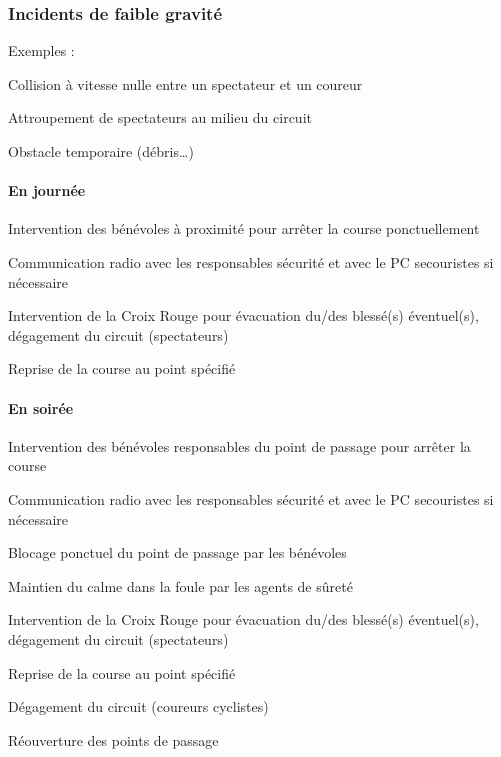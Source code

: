 \documentclass[hidelinks, paper=a4, fontsize=13pt]{report}
\begin{document}
\subsubsection{Incidents de faible gravité}


Exemples :
\begin{list}{•}{}
\item Collision à vitesse nulle entre un spectateur et un coureur
\item Attroupement de spectateurs au milieu du circuit
\item Obstacle temporaire (débris…)
\end{list}


\paragraph{En journée}

\begin{list}{•}{}
\item Intervention des bénévoles à proximité pour arrêter la course ponctuellement 
\item Communication radio avec les responsables sécurité et avec le PC secouristes si nécessaire
\item Intervention de la Croix Rouge pour évacuation du/des blessé(s) éventuel(s), dégagement du circuit (spectateurs)
\item Reprise de la course au point spécifié
\end{list}


\paragraph{En soirée}
\begin{list}{•}{}
\item Intervention des bénévoles responsables du point de passage pour arrêter la course
\item Communication radio avec les responsables sécurité et avec le PC secouristes si nécessaire
\item Blocage ponctuel du point de passage par les bénévoles
\item Maintien du calme dans la foule par les agents de sûreté
\item Intervention de la Croix Rouge pour évacuation du/des blessé(s) éventuel(s), dégagement du circuit (spectateurs)
\item Reprise de la course au point spécifié
\item Dégagement du circuit (coureurs cyclistes)
\item Réouverture des points de passage
\end{list}
\end{document}
